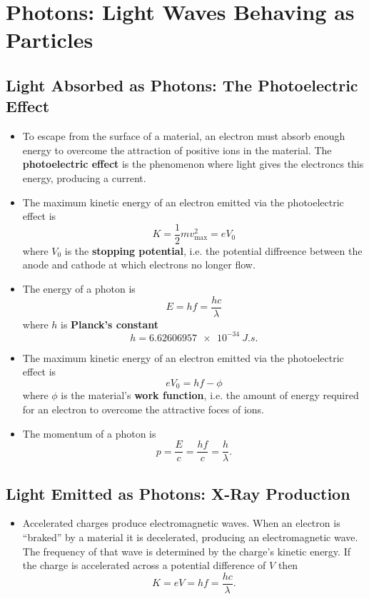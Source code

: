 \documentclass{article}
\begin{document}
\section{Photons: Light Waves Behaving as Particles}

\subsection{Light Absorbed as Photons: The Photoelectric Effect}

\begin{itemize}
  \item To escape from the surface of a material, an electron must absorb enough energy to overcome the attraction of positive ions in the material. The \textbf{photoelectric effect} is the phenomenon where light gives the electroncs this energy, producing a current.

  \item The maximum kinetic energy of an electron emitted via the photoelectric effect is \[K = \frac{1}{2} m v_\text{max}^2 = e V_0\] where $V_0$ is the \textbf{stopping potential}, i.e. the potential diffreence between the anode and cathode at which electrons no longer flow.

  \item The energy of a photon is \[E = h f = \frac{h c}{\lambda}\] where $h$ is \textbf{Planck's constant} \[h = \qty{6.62606957e-34}{J.s}.\]

  \item The maximum kinetic energy of an electron emitted via the photoelectric effect is \[e V_0 = h f - \phi\] where $\phi$ is the material's \textbf{work function}, i.e. the amount of energy required for an electron to overcome the attractive foces of ions.

  \item The momentum of a photon is \[p = \frac{E}{c} = \frac{h f}{c} = \frac{h}{\lambda}.\]
\end{itemize}

\subsection{Light Emitted as Photons: X-Ray Production}

\begin{itemize}
  \item Accelerated charges produce electromagnetic waves. When an electron is ``braked'' by a material it is decelerated, producing an electromagnetic wave. The frequency of that wave is determined by the charge's kinetic energy. If the charge is accelerated across a potential difference of $V$ then \[K = e V = h f = \frac{h c}{\lambda}.\]
\end{itemize}
\end{document}
